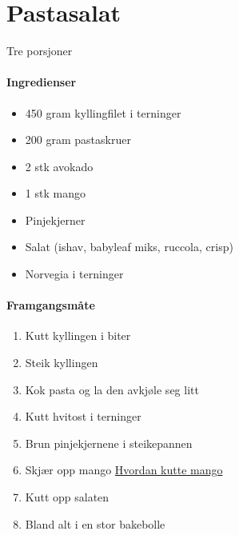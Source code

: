 \section{﻿Pastasalat}
Tre porsjoner

\paragraph{Ingredienser}
\begin{itemize}[noitemsep]
	\item 450 gram kyllingfilet i terninger
	\item 200 gram pastaskruer
	\item 2 stk avokado
	\item 1 stk mango
	\item Pinjekjerner
	\item Salat (ishav, babyleaf miks, ruccola, crisp)
	\item Norvegia i terninger
\end{itemize}

\paragraph{Framgangsmåte}
\begin{enumerate}[noitemsep]
	\item Kutt kyllingen i biter
	\item Steik kyllingen
	\item Kok pasta og la den avkjøle seg litt
	\item Kutt hvitost i terninger
	\item Brun pinjekjernene i steikepannen
	\item Skjær opp mango \href{https://www.youtube.com/results?search_query=how%20to%20cut%20mango}{Hvordan kutte mango}
	\item Kutt opp salaten
	\item Bland alt i en stor bakebolle
\end{enumerate}
